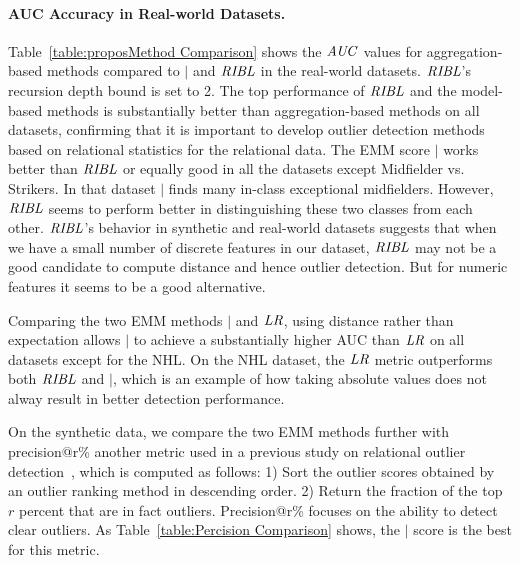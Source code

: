 {	\paragraph{AUC Accuracy in Real-world Datasets.}
Table~\ref{table:proposMethod Comparison} shows the $\it{AUC}$ values
 for aggregation-based methods compared to $\mid$ and $\it{RIBL}$ in the real-world datasets.  $\it{RIBL}$'s recursion depth bound is set to 2. The top performance of $\it{RIBL}$ and the model-based methods is substantially better than aggregation-based methods on all datasets,  confirming that it is important to develop outlier detection methods based on relational statistics for the relational data. The  EMM score $\mid$ works better than $\it{RIBL}$ or equally good in all the datasets except Midfielder vs. Strikers. In that dataset $\mid$ finds many in-class exceptional midfielders. However, $\it{RIBL}$ seems to perform better in distinguishing these two classes from each other. $\it{RIBL}$'s behavior in synthetic and real-world datasets suggests that when we have a small number of discrete features in our dataset, $\it{RIBL}$ may not be a good candidate to compute distance and hence outlier detection. But for numeric features it seems to be a good alternative.

Comparing the two EMM methods $\mid$ and $\it{LR}$, using distance rather than expectation allows $\mid$ to achieve a substantially higher AUC than $\it{LR}$ on all datasets except for the NHL. On the NHL dataset, the $\it{LR}$ metric outperforms both $\it{RIBL}$ and $\mid$, which is an example of how taking absolute values does not alway result in better detection performance.   

On the synthetic data, we compare the two EMM methods further  with precision@r\% another metric used in a previous study on relational outlier detection~\cite{Gao2010}, which is computed as follows: 1) Sort the outlier scores obtained by an outlier ranking method in descending order. 2) Return the fraction of the top $r$ percent that are in fact outliers. Precision@r\% focuses on the ability to detect clear outliers. As Table~\ref{table:Percision Comparison} shows, the $\mid$ score is the best for this metric.

	\begin{table}
		\begin{subtable}
			
			\centering
\end{subtable}
\end{table}}
